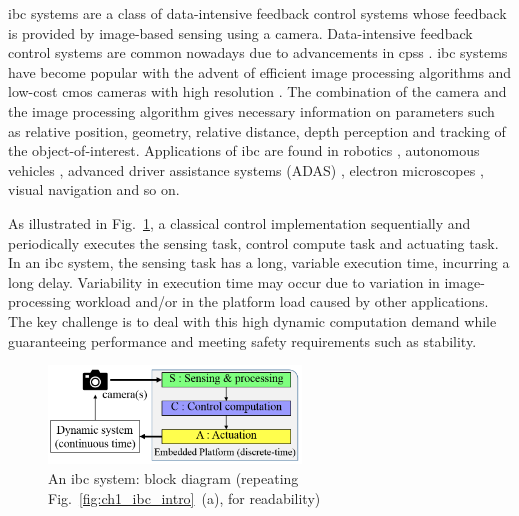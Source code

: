 \Gls{ibc} systems are a class of data-intensive feedback control systems whose feedback is provided by image-based sensing using a camera. Data-intensive feedback control systems are common nowadays due to advancements in \glspl{cps} \cite{van2018data}. \Gls{ibc} systems have become popular with the advent of efficient image processing algorithms and low-cost \gls{cmos} cameras with high resolution \cite{corke2017robotics}. The combination of the camera and the image processing algorithm gives necessary information on parameters such as relative position, geometry, relative distance, depth perception and tracking of the object-of-interest. Applications of \gls{ibc} are found in robotics \cite{corke2017robotics}, autonomous vehicles \cite{elfring2016effective,pendleton2017perception}, advanced driver assistance systems (ADAS) \cite{bengler2014three}, electron microscopes \cite{FEI}, visual navigation \cite{chakraborty2016compensating} and so on.

As illustrated in Fig.\ \ref{fig:ch5_ibc_bd}, a classical control implementation sequentially and periodically executes the sensing task, control compute task and actuating task. In an \gls{ibc} system, the sensing task has a long, variable execution time, incurring a long delay. Variability in execution time may occur due to variation in image-processing workload and/or in the platform load caused by other applications. The key challenge is to deal with this high dynamic computation demand while guaranteeing performance and meeting safety requirements such as stability. 

\begin{figure}
\vspace*{-1.5ex}
    \centerline{
     \includegraphics[width=0.6\textwidth]{images/IBC_bd2.png}
    }
    \vspace*{-1.5ex}
    \caption{An \gls{ibc} system: block diagram (repeating Fig.~\ref{fig:ch1_ibc_intro}~(a), for readability)}
    \label{fig:ch5_ibc_bd}
\end{figure}

